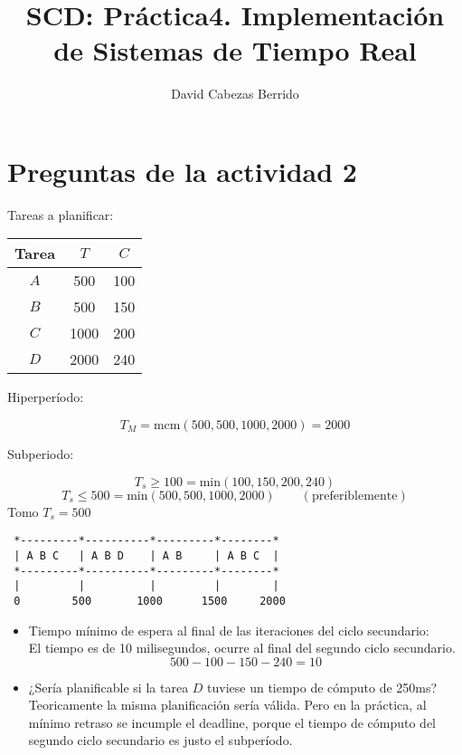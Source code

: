 \documentclass[12pt,spanish]{article}
\begin{document}
\title{SCD: Práctica4. Implementación de Sistemas de Tiempo Real}
\author{David Cabezas Berrido}
\date{\vspace{-5mm}}
\maketitle

\section*{Preguntas de la actividad 2}

Tareas a planificar:

\begin{table}[H]
  \centering
\begin{tabular}{|c|c|c|}
\hline
Tarea & $T$  & $C$ \\ \hline \hline
$A$   & 500  & 100 \\ \hline
$B$   & 500  & 150 \\ \hline
$C$   & 1000 & 200 \\ \hline
$D$   & 2000 & 240 \\ \hline
\end{tabular}
\end{table}

Hiperperíodo:

\[T_M=\text{mcm}(500,500,1000,2000) = 2000\]

Subperiodo:

\[T_s \geq 100=\text{min}(100,150,200,240)\]
\[T_s \leq 500=\text{min}(500,500,1000,2000) \qquad (\text{preferiblemente})\]
Tomo $T_s = 500$ 
\begin{verbatim}
 *---------*----------*---------*--------*
 | A B C   | A B D    | A B     | A B C  |
 *---------*----------*---------*--------*
 |         |          |         |        |
 0        500       1000      1500     2000
\end{verbatim}

\begin{itemize}
\item Tiempo mínimo de espera al final de las iteraciones del ciclo
  secundario: \\

  El tiempo es de 10 milisegundos, ocurre al final del segundo ciclo
  secundario.
  \[500-100-150-240=10\]

\item ¿Sería planificable si la tarea $D$ tuviese un tiempo de cómputo
  de 250ms? \\

  Teoricamente la misma planificación sería válida. Pero en la
  práctica, al mínimo retraso se incumple el deadline, porque el
  tiempo de cómputo del segundo ciclo secundario es justo el
  subperíodo.
\end{itemize}
\end{document}
